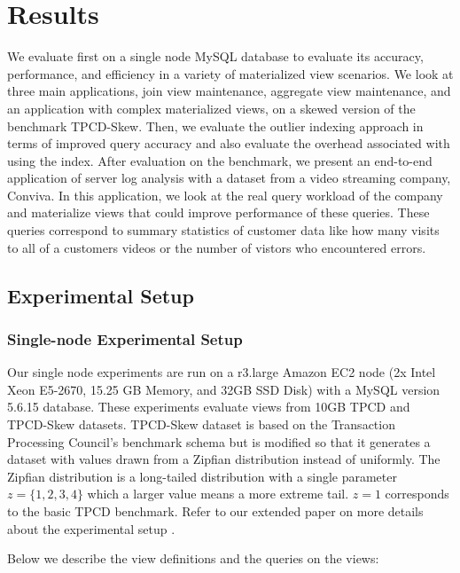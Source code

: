 \vspace{-.5em}
\section{Results}
\label{exp}
We evaluate \svc first on a single node MySQL database to evaluate its accuracy, performance, and efficiency in a variety of materialized view 
scenarios.
We look at three main applications, join view maintenance, aggregate view maintenance, and an application with complex materialized views, on a skewed version of the benchmark TPCD-Skew.
Then, we evaluate the outlier indexing approach in terms of improved query accuracy and also evaluate the overhead associated with using the index.
After evaluation on the benchmark, we present an end-to-end application of server log analysis with a dataset from a video streaming company, Conviva.
In this application, we look at the real query workload of the company and materialize views that could improve performance of these queries.
These queries correspond to summary statistics of customer data like how many visits to all of a customers videos or the number of vistors who encountered errors.

\subsection{Experimental Setup}\vspace{-.5em}
\subsubsection{Single-node Experimental Setup}
Our single node experiments are run on a r3.large Amazon EC2 node (2x Intel Xeon E5-2670, 15.25 GB Memory, and 32GB SSD Disk) with a MySQL version 5.6.15 database.
These experiments evaluate views from 10GB TPCD and TPCD-Skew datasets.
TPCD-Skew dataset \cite{tpcdskew} is based on the Transaction Processing Council's benchmark
schema but is modified so that it generates a dataset with values drawn from a Zipfian distribution instead of uniformly.
The Zipfian distribution \cite{mitzenmacher2004brief} is a long-tailed distribution with a single parameter $z=\{1,2,3,4\}$ which a larger
value means a more extreme tail.
$z=1$ corresponds to the basic TPCD benchmark. 
Refer to our extended paper on more details about the experimental setup \cite{technicalReport}.

Below we describe the view definitions and the queries on the views:

